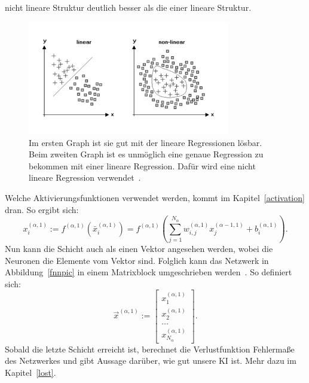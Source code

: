 \documentclass[11pt]{article}
\begin{document}
nicht lineare Struktur deutlich besser als die einer lineare Struktur.
\begin{figure}[h]
    \centering
    \includegraphics[width=250pt, keepaspectratio]{images/regression}
    \caption[Lineare Regression und nicht lineare Regression~\cite{6}]{Im ersten Graph ist sie gut mit der lineare Regressionen lösbar. Beim zweiten Graph ist es
    unmöglich eine genaue Regression zu bekommen mit einer lineare Regression. Dafür wird eine nicht lineare Regression verwendet~\cite{6}.}\label{regressionpic}
\end{figure}
Welche Aktivierungsfunktionen verwendet werden, kommt im Kapitel~\ref{activation} dran. So ergibt sich:
\begin{equation}
    x_{i}^{(\alpha,1)} := f^{(\alpha,1)}(\bar{x}_{i}^{(\alpha,1)}) = f^{(\alpha,1)}(\sum_{j=1}^{N_{\alpha}} w_{i,j}^{(\alpha,1)} x_{j}^{(\alpha-1,1)} + b_{i}^{(\alpha,1)}).
\end{equation}
Nun kann die Schicht auch als einen Vektor angesehen werden, wobei die Neuronen die Elemente vom Vektor sind. Folglich kann das Netzwerk
in Abbildung~\ref{fnnpic} in einem Matrixblock umgeschrieben werden~\cite{13}. So definiert sich:
\begin{equation}\label{withfunction}
    \vec{x}^{(\alpha,1)} := \begin{bmatrix}x_{1}^{(\alpha,1)} \\ x_{2}^{(\alpha,1)} \\ \ldots \\ x_{N_{\alpha}}^{(\alpha,1)} \end{bmatrix}.
\end{equation}
Sobald die letzte Schicht erreicht ist, berechnet die Verlustfunktion Fehlermaße des Netzwerkes und gibt Aussage darüber, wie gut
unsere KI ist. Mehr dazu im Kapitel~\ref{lost}.
\end{document}
